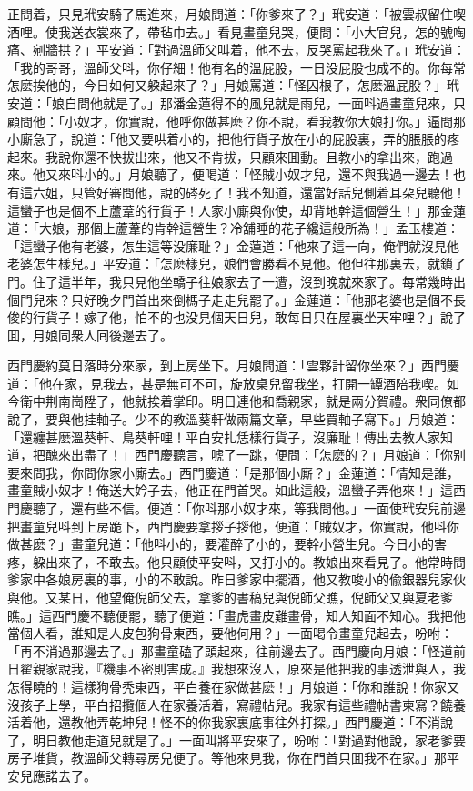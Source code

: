 正問着，只見玳安騎了馬進來，月娘問道：「你爹來了？」玳安道：「被雲叔留住喫酒哩。使我送衣裳來了，帶毡巾去。」看見畫童兒哭，便問：「小大官兒，怎的號啕痛、剜牆拱？」平安道：「對過溫師父叫着，他不去，反哭罵起我來了。」玳安道：「我的哥哥，溫師父呌，你仔細！他有名的溫屁股，一日没屁股也成不的。你每常怎麽挨他的，今日如何又躱起來了？」月娘罵道：「怪囚根子，怎麽溫屁股？」玳安道：「娘自問他就是了。」那潘金蓮得不的風兒就是雨兒，一面呌過畫童兒來，只顧問他：「小奴才，你實說，他呼你做甚麽？你不說，看我教你大娘打你。」逼問那小廝急了，說道：「他又要哄着小的，把他行貨子放在小的屁股裏，弄的脹脹的疼起來。我說你還不快拔出來，他又不肯拔，只顧來囬動。且教小的拿出來，跑過來。他又來呌小的。」月娘聽了，便喝道：「怪賊小奴才兒，還不與我過一邊去！也有這六姐，只管好審問他，說的硶死了！我不知道，還當好話兒側着耳朶兒聽他！這蠻子也是個不上蘆葦的行貨子！人家小廝與你使，却背地幹這個營生！」那金蓮道：「大娘，那個上蘆葦的肯幹這營生？冷舖睡的花子纔這般所為！」孟玉樓道：「這蠻子他有老婆，怎生這等没廉耻？」金蓮道：「他來了這一向，俺們就沒見他老婆怎生樣兒。」平安道：「怎麽樣兒，娘們會勝看不見他。他但往那裏去，就鎖了門。住了這半年，我只見他坐轎子往娘家去了一遭，沒到晚就來家了。每常幾時出個門兒來？只好晚夕門首出來倒榪子走走兒罷了。」金蓮道：「他那老婆也是個不長俊的行貨子！嫁了他，怕不的也没見個天日兒，敢每日只在屋裏坐天牢哩？」說了囬，月娘同衆人囘後邊去了。

西門慶約莫日落時分來家，到上房坐下。月娘問道：「雲夥計留你坐來？」西門慶道：「他在家，見我去，甚是無可不可，旋放桌兒留我坐，打開一罈酒陪我喫。如今衛中荆南崗陞了，他就挨着掌印。明日連他和喬親家，就是兩分賀禮。衆同僚都說了，要與他挂軸子。少不的教溫葵軒做兩篇文章，早些買軸子寫下。」月娘道：「還纏甚麽溫葵軒、鳥葵軒哩！平白安扎恁樣行貨子，沒廉耻！傳出去教人家知道，把醜來出盡了！」西門慶聽言，唬了一跳，便問：「怎麽的？」月娘道：「你别要來問我，你問你家小廝去。」西門慶道：「是那個小廝？」金蓮道：「情知是誰，畫童賊小奴才！俺送大妗子去，他正在門首哭。如此這般，溫蠻子弄他來！」這西門慶聽了，還有些不信。便道：「你呌那小奴才來，等我問他。」一面使玳安兒前邊把畫童兒呌到上房跪下，西門慶要拿拶子拶他，便道：「賊奴才，你實說，他呌你做甚麽？」畫童兒道：「他呌小的，要灌醉了小的，要幹小營生兒。今日小的害疼，躱出來了，不敢去。他只顧使平安呌，又打小的。教娘出來看見了。他常時問爹家中各娘房裏的事，小的不敢說。昨日爹家中擺酒，他又教唆小的偸銀器兒家伙與他。又某日，他望俺倪師父去，拿爹的書稿兒與倪師父瞧，倪師父又與夏老爹瞧。」這西門慶不聽便罷，聽了便道：「畫虎畫皮難畫骨，知人知面不知心。我把他當個人看，誰知是人皮包狗骨東西，要他何用？」一面喝令畫童兒起去，吩咐：「再不消過那邊去了。」那畫童磕了頭起來，往前邊去了。西門慶向月娘：「怪道前日翟親家說我，『機事不密則害成。』我想來沒人，原來是他把我的事透泄與人，我怎得曉的！這樣狗骨秃東西，平白養在家做甚麽！」月娘道：「你和誰說！你家又沒孩子上學，平白招攬個人在家養活着，寫禮帖兒。我家有這些禮帖書柬寫？饒養活着他，還教他弄乾坤兒！怪不的你我家裏底事往外打探。」西門慶道：「不消說了，明日教他走道兒就是了。」一面叫將平安來了，吩咐：「對過對他說，家老爹要房子堆貨，教溫師父轉尋房兒便了。等他來見我，你在門首只囬我不在家。」那平安兒應諾去了。

